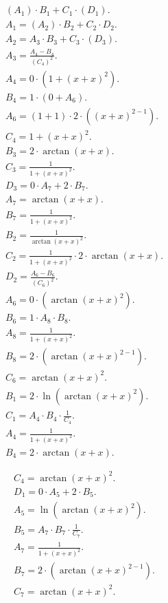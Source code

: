 \documentclass[12pt,a4paper]{extreport}
\begin{document}
\begin{multline}
\\
(A_{1}) \cdot B_{1} + C_{1} \cdot (D_{1}).\\
A_{1} = (A_{2}) \cdot B_{2} + C_{2} \cdot D_{2}.\\
A_{2} = A_{3} \cdot B_{3} + C_{3} \cdot (D_{3}).\\
A_{3} = \frac{A_{4} - B_{4}}{(C_{4}) ^ {2}}.\\
A_{4} = 0 \cdot (1 + (x + x) ^ {2}).\\
B_{4} = 1 \cdot (0 + A_{6}).\\
A_{6} = (1 + 1) \cdot 2 \cdot ((x + x) ^ {2 - 1}).\\
C_{4} = 1 + (x + x) ^ {2}.\\
B_{3} = 2 \cdot \arctan(x + x).\\
C_{3} = \frac{1}{1 + (x + x) ^ {2}}.\\
D_{3} = 0 \cdot A_{7} + 2 \cdot B_{7}.\\
A_{7} = \arctan(x + x).\\
B_{7} = \frac{1}{1 + (x + x) ^ {2}}.\\
B_{2} = \frac{1}{\arctan(x + x) ^ {2}}.\\
C_{2} = \frac{1}{1 + (x + x) ^ {2}} \cdot 2 \cdot \arctan(x + x).\\
D_{2} = \frac{A_{6} - B_{6}}{(C_{6}) ^ {2}}.\\
A_{6} = 0 \cdot (\arctan(x + x) ^ {2}).\\
B_{6} = 1 \cdot A_{8} \cdot B_{8}.\\
A_{8} = \frac{1}{1 + (x + x) ^ {2}}.\\
B_{8} = 2 \cdot (\arctan(x + x) ^ {2 - 1}).\\
C_{6} = \arctan(x + x) ^ {2}.\\
B_{1} = 2 \cdot \ln(\arctan(x + x) ^ {2}).\\
C_{1} = A_{4} \cdot B_{4} \cdot \frac{1}{C_{4}}.\\
A_{4} = \frac{1}{1 + (x + x) ^ {2}}.\\
B_{4} = 2 \cdot \arctan(x + x).\\
\end{multline}
\begin{multline}
\\
C_{4} = \arctan(x + x) ^ {2}.\\
D_{1} = 0 \cdot A_{5} + 2 \cdot B_{5}.\\
A_{5} = \ln(\arctan(x + x) ^ {2}).\\
B_{5} = A_{7} \cdot B_{7} \cdot \frac{1}{C_{7}}.\\
A_{7} = \frac{1}{1 + (x + x) ^ {2}}.\\
B_{7} = 2 \cdot (\arctan(x + x) ^ {2 - 1}).\\
C_{7} = \arctan(x + x) ^ {2}.\\
\end{multline}
\end{document}
